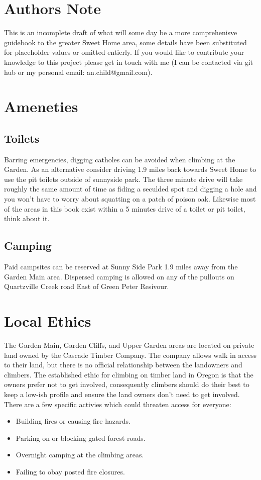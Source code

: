 \section{Authors Note}
This is an incomplete draft of what will some day be a more comprehenisve guidebook to the greater Sweet Home area, some details have been substituted for placeholder values or omitted entierly. If you would like to contribute your knowledge to this project please get in touch with me (I can be contacted via git hub or my personal email: an.child@gmail.com).
\section{Ameneties}
\subsection*{Toilets}
Barring emergencies, digging catholes can be avoided when climbing at the Garden. As an alternative consider driving 1.9 miles back towards Sweet Home to use the pit toilets outside of sunnyside park. The three minute drive will take roughly the same amount of time as fiding a seculded spot and digging a hole and you won't have to worry about squatting on a patch of poison oak. Likewise most of the areas in this book exist within a 5 minutes drive of a toilet or pit toilet, think about it. 
\subsection*{Camping}
Paid campsites can be reserved at Sunny Side Park 1.9 miles away from the Garden Main area. Dispersed camping is allowed on any of the pullouts on Quartzville Creek road East of Green Peter Resivour. 
\section{Local Ethics}
The Garden Main, Garden Cliffs, and Upper Garden areas are located on private land owned by the Cascade Timber Company. The company allows walk in access to their land, but there is no official relationship between the landowners and climbers. The established ethic for climbing on timber land in Oregon is that the owners prefer not to get involved, consequently climbers should do their best to keep a low-ish profile and ensure the land owners don't need to get involved. There are a few specific activies which could threaten access for everyone:\\
\begin{itemize}
\item Building fires or causing fire hazards.\\
\item Parking on or blocking gated forest roads.\\
\item Overnight camping at the climbing areas.\\
\item Failing to obay posted fire closures.\\
\end{itemize}
